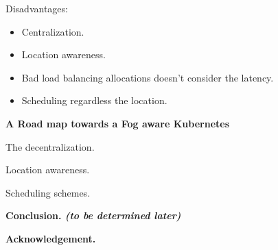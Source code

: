 \documentclass[9pt]{article}
\begin{document}
\begin{outline}
\begin{outline}
		\item Disadvantages: 
		\begin{itemize}
			\item Centralization.
			\item Location awareness.
			\item Bad load balancing allocations doesn't consider the latency.
			\item Scheduling regardless the location.
		\end{itemize}
	\end{outline}
	
	\item {\bf  A Road map towards a Fog aware Kubernetes}
	\begin{outline}
		\item The decentralization.
		\item Location awareness. 
		\item Scheduling schemes.
				
	\end{outline}

	\item {\bf Conclusion. {\em (to be determined later)}}
	\item {\bf Acknowledgement.}



	

\end{outline}
\end{document}
